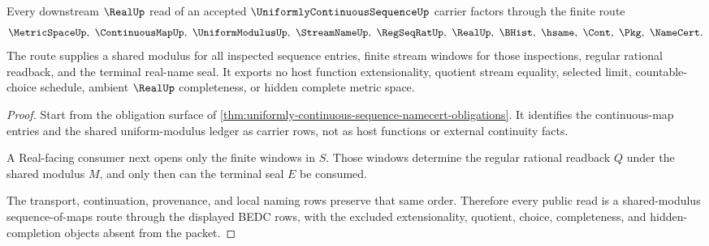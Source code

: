 \begin{theorem}
\label{thm:uniformly-continuous-sequence-shared-modulus-handoff}
Every downstream $\RealUp$ read of an accepted $\UniformlyContinuousSequenceUp$ carrier factors through the finite route
$$
\MetricSpaceUp,\ \ContinuousMapUp,\ \UniformModulusUp,\ \StreamNameUp,\ \RegSeqRatUp,\ \RealUp,\ \BHist,\ \hsame,\ \Cont,\ \Pkg,\ \NameCert .
$$
The route supplies a shared modulus for all inspected sequence entries, finite stream windows for those inspections, regular rational readback, and the terminal real-name seal. It exports no host function extensionality, quotient stream equality, selected limit, countable-choice schedule, ambient $\RealUp$ completeness, or hidden complete metric space.
\end{theorem}
\begin{proof}
Start from the obligation surface of \autoref{thm:uniformly-continuous-sequence-namecert-obligations}. It identifies the continuous-map entries and the shared uniform-modulus ledger as carrier rows, not as host functions or external continuity facts.

A Real-facing consumer next opens only the finite windows in $S$. Those windows determine the regular rational readback $Q$ under the shared modulus $M$, and only then can the terminal seal $E$ be consumed.

The transport, continuation, provenance, and local naming rows preserve that same order. Therefore every public read is a shared-modulus sequence-of-maps route through the displayed BEDC rows, with the excluded extensionality, quotient, choice, completeness, and hidden-completion objects absent from the packet.
\end{proof}

